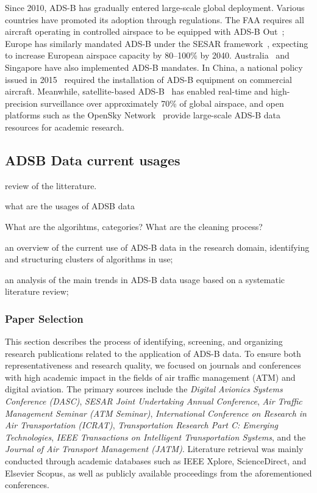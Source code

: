 Since 2010, ADS-B has gradually entered large-scale global deployment. Various countries have promoted its adoption through regulations. The FAA requires all aircraft operating in controlled airspace to be equipped with ADS-B Out~\cite{cfr91-225}; Europe has similarly mandated ADS-B under the SESAR framework~\cite{undertaking2009european}, expecting to increase European airspace capacity by 80–100\% by 2040. Australia~\cite{casa2010cao20-18} and Singapore have also implemented ADS-B mandates. In China, a national policy issued in 2015~\cite{caac2015adsb} required the installation of ADS-B equipment on commercial aircraft. Meanwhile, satellite-based ADS-B~\cite{melero2024satera} has enabled real-time and high-precision surveillance over approximately 70\% of global airspace, and open platforms such as the OpenSky Network~\cite{schafer2014bringing} provide large-scale ADS-B data resources for academic research.


\subsection{ADSB Data current usages}
review of the litterature.

what are the usages of ADSB data

What are the algorihtms, categories?
What are the cleaning process?


an overview of the current use of ADS-B data in the research domain, identifying and structuring clusters of algorithms in use;

 an analysis of the main trends in ADS-B data usage based on a systematic literature review;

 \subsubsection{Paper Selection}

This section describes the process of identifying, screening, and organizing research publications related to the application of ADS-B data. To ensure both representativeness and research quality, we focused on journals and conferences with high academic impact in the fields of air traffic management (ATM) and digital aviation. The primary sources include the \textit{Digital Avionics Systems Conference (DASC)}, \textit{SESAR Joint Undertaking Annual Conference}, \textit{Air Traffic Management Seminar (ATM Seminar)}, \textit{International Conference on Research in Air Transportation (ICRAT)}, \textit{Transportation Research Part C: Emerging Technologies}, \textit{IEEE Transactions on Intelligent Transportation Systems}, and the \textit{Journal of Air Transport Management (JATM)}. Literature retrieval was mainly conducted through academic databases such as IEEE Xplore, ScienceDirect, and Elsevier Scopus, as well as publicly available proceedings from the aforementioned conferences.

